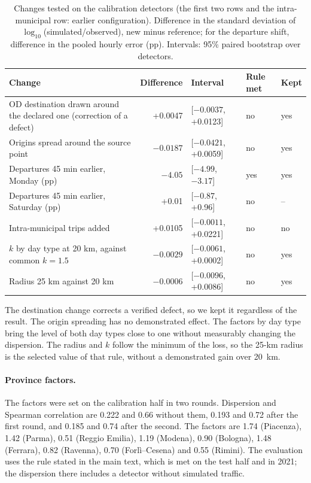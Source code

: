 \documentclass[11pt,a4paper]{article}
\begin{document}
\begin{table}[htbp]\centering
\caption{Changes tested on the calibration detectors (the first two rows and the intra-municipal row: earlier configuration). Difference in the standard deviation of $\log_{10}$(simulated/observed), new minus reference; for the departure shift, difference in the pooled hourly error (pp). Intervals: 95\% paired bootstrap over detectors.}
\label{tab:rounds}
\begin{tabular}{@{}p{6.6cm}rlll@{}}\toprule
Change & Difference & Interval & Rule met & Kept \\\midrule
OD destination drawn around the declared one (correction of a defect) & +0.0047 & [$-0.0037$, +0.0123] & no & yes \\
Origins spread around the source point & $-0.0187$ & [$-0.0421$, +0.0059] & no & yes \\
Departures 45 min earlier, Monday (pp) & $-4.05$ & [$-4.99$, $-3.17$] & yes & yes \\
Departures 45 min earlier, Saturday (pp) & +0.01 & [$-0.87$, +0.96] & no & -- \\
Intra-municipal trips added & +0.0105 & [$-0.0011$, +0.0221] & no & no \\
$k$ by day type at 20 km, against common $k=1.5$ & $-0.0029$ & [$-0.0061$, +0.0002] & no & yes \\
Radius 25 km against 20 km & $-0.0006$ & [$-0.0096$, +0.0086] & no & yes \\
\bottomrule\end{tabular}\end{table}

The destination change corrects a verified defect, so we kept it regardless of the result. The origin spreading has no demonstrated effect. The factors by day type bring the level of both day types close to one without measurably changing the dispersion. The radius and $k$ follow the minimum of the loss, so the 25-km radius is the selected value of that rule, without a demonstrated gain over 20~km.

\paragraph{Province factors.} The factors were set on the calibration half in two rounds. Dispersion and Spearman correlation are 0.222 and 0.66 without them, 0.193 and 0.72 after the first round, and 0.185 and 0.74 after the second. The factors are 1.74 (Piacenza), 1.42 (Parma), 0.51 (Reggio Emilia), 1.19 (Modena), 0.90 (Bologna), 1.48 (Ferrara), 0.82 (Ravenna), 0.70 (Forl\`i--Cesena) and 0.55 (Rimini). The evaluation uses the rule stated in the main text, which is met on the test half and in 2021; the dispersion there includes a detector without simulated traffic.
\end{document}
